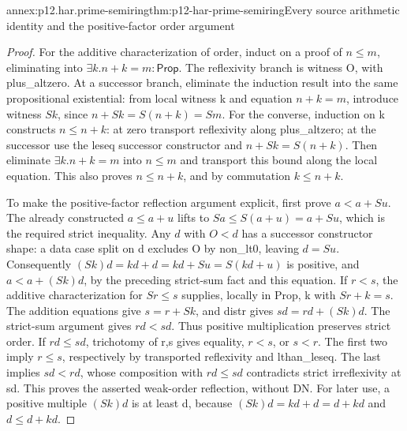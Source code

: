 \begin{annexitem}{annex:p12.har.prime-semiring}{thm:p12-har-prime-semiring}{Every source arithmetic identity and the positive-factor order argument}
\begin{proof}
For the additive characterization of order, induct on a proof of
\(n\le m\), eliminating into \(\exists k.n+k=m:\mathsf{Prop}\).
The reflexivity branch is witness O, with plus_altzero.
At a successor branch, eliminate the induction result into the same
propositional existential: from local witness k and equation
\(n+k=m\), introduce witness \(S k\), since
\(n+S k=S(n+k)=S m\).
For the converse, induction on k constructs \(n\le n+k\): at
zero transport reflexivity along plus_altzero; at the successor use
the leseq successor constructor and \(n+S k=S(n+k)\).
Then eliminate \(\exists k.n+k=m\) into \(n\le m\) and transport
this bound along the local equation. This also proves
\(n\le n+k\), and by commutation \(k\le n+k\).

To make the positive-factor reflection argument explicit, first prove
\(a<a+S u\). The already constructed \(a\le a+u\) lifts to
\(S a\le S(a+u)=a+S u\), which is the required strict inequality.
Any \(d\) with \(O<d\) has a successor constructor shape: a data
case split on d excludes O by non_lt0, leaving \(d=S u\).
Consequently \((S k)d=kd+d=kd+S u=S(kd+u)\) is positive,
and \(a<a+(S k)d\), by the preceding strict-sum fact and this
equation. If \(r<s\), the additive characterization for
\(S r\le s\) supplies, locally in Prop, k with
\(S r+k=s\). The addition equations give \(s=r+S k\), and distr
gives \(sd=rd+(S k)d\). The strict-sum argument gives \(rd<sd\).
Thus positive multiplication preserves strict order.
If \(rd\le sd\), trichotomy of r,s gives equality, \(r<s\), or
\(s<r\). The first two imply \(r\le s\), respectively by
transported reflexivity and lthan_leseq. The last implies \(sd<rd\),
whose composition with \(rd\le sd\) contradicts strict irreflexivity
at sd. This proves the asserted weak-order reflection, without DN.
For later use, a positive multiple \((S k)d\) is at least d,
because \((S k)d=kd+d=d+kd\) and \(d\le d+kd\).
\end{proof}
\end{annexitem}

